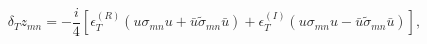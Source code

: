 \begin{equation}\label{22}
\delta_T z_{mn}=-\frac{i}{4}[\epsilon^{(R)}_T(u\sigma_{mn}u+\bar 
u\tilde\sigma_{mn}\bar u)+\epsilon^{(I)}_T(u\sigma_{mn}u-\bar 
u\tilde\sigma_{mn}\bar u)],
\end{equation}

